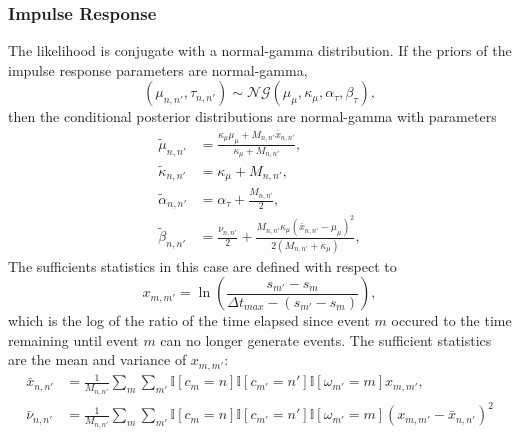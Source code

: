 		\subsubsection*{Impulse Response}
			The likelihood is conjugate with a normal-gamma distribution. If the priors of the impulse response parameters are normal-gamma,
			\begin{equation}
				(\mu_{n,n'}, \tau_{n,n'}) \sim \mathcal{NG} (\mu_\mu, \kappa_\mu, \alpha_\tau, \beta_\tau),
			\end{equation}
			then the conditional posterior distributions are normal-gamma with parameters
			\begin{align}
				\tilde{\mu}_{n,n'} &= \frac{\kappa_\mu \mu_\mu + M_{n,n'}\bar{x}_{n,n'}}{\kappa_\mu + M_{n,n'}}, \\
				\tilde{\kappa}_{n,n'} &= \kappa_{\mu} + M_{n,n'}, \\
				\tilde{\alpha}_{n,n'} &= \alpha_\tau + \frac{M_{n,n'}}{2}, \\
				\tilde{\beta}_{n,n'} &= \frac{\nu_{n,n'}}{2} + \frac{M_{n,n'} \kappa_\mu (\bar{x}_{n,n'} - \mu_\mu)^2}{2(M_{n,n'} + \kappa_\mu)},
			\end{align}
			The sufficients statistics in this case are defined with respect to
			\begin{equation}
				x_{m,m'} = \ln \left( \frac{s_{m'} - s_m}{\Delta t_{max} - (s_{m'} - s_m)} \right),
			\end{equation}
			which is the log of the ratio of the time elapsed since event $m$ occured to the time remaining until event $m$ can no longer generate events. The sufficient statistics are the mean and variance of $x_{m,m'}$:
			\begin{align}
				\bar{x}_{n,n'} &= \frac{1}{M_{n,n'}} \sum_m \sum_{m'} \mathbb{I}\left[ c_m = n \right] \mathbb{I}\left[ c_{m'} = n' \right] \mathbb{I}\left[ \omega_{m'} = m \right] x_{m,m'}, \\
				\bar{\nu}_{n,n'} &= \frac{1}{M_{n,n'}} \sum_m \sum_{m'} \mathbb{I}\left[ c_m = n \right] \mathbb{I}\left[ c_{m'} = n' \right] \mathbb{I}\left[ \omega_{m'} = m \right] (x_{m,m'} - \bar{x}_{n,n'})^2
			\end{align}

